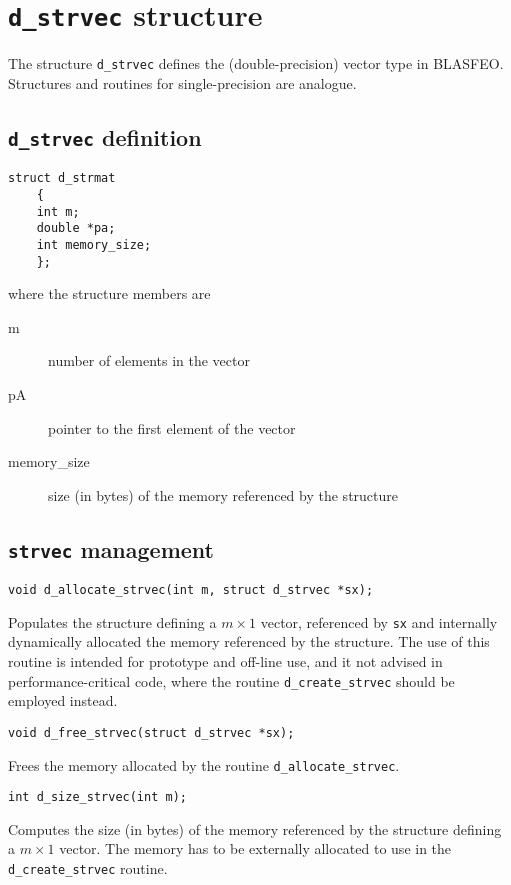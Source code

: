 \documentclass[a4paper]{report}
\begin{document}
\section{{\tt d\_strvec} structure}

The structure {\tt d\_strvec} defines the (double-precision) vector type in BLASFEO.
Structures and routines for single-precision are analogue.



\subsection{{\tt d\_strvec} definition}

\begin{verbatim}
struct d_strmat 
    {
    int m;
    double *pa;
    int memory_size;
    };
\end{verbatim}
where the structure members are
\begin{description}
\item[m] number of elements in the vector
\item[pA] pointer to the first element of the vector
\item[memory\_size] size (in bytes) of the memory referenced by the structure
\end{description}



\subsection{{\tt strvec} management}

\begin{verbatim}
void d_allocate_strvec(int m, struct d_strvec *sx);
\end{verbatim}
Populates the structure defining a $m\times 1$ vector, referenced by {\tt sx} and internally dynamically allocated the memory referenced by the structure.
The use of this routine is intended for prototype and off-line use, and it not advised in performance-critical code, where the routine {\tt d\_create\_strvec} should be employed instead.

\begin{verbatim}
void d_free_strvec(struct d_strvec *sx);
\end{verbatim}
Frees the memory allocated by the routine {\tt d\_allocate\_strvec}.

\begin{verbatim}
int d_size_strvec(int m);
\end{verbatim}
Computes the size (in bytes) of the memory referenced by the structure defining a $m\times 1$ vector.
The memory has to be externally allocated to use in the {\tt d\_create\_strvec} routine.
\end{document}
